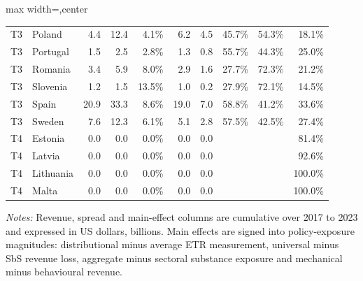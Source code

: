 \begin{table}[H]
\begin{adjustbox}{max width=\textwidth,center}
\begin{tabular}{@{}llrrrrrrrr@{}}
T3 & Poland &  4.4 &  12.4 &   4.1\% &  6.2 &  4.5 &  45.7\% &  54.3\% &  18.1\% \\
T3 & Portugal &  1.5 &   2.5 &   2.8\% &  1.3 &  0.8 &  55.7\% &  44.3\% &  25.0\% \\
T3 & Romania &  3.4 &   5.9 &   8.0\% &  2.9 &  1.6 &  27.7\% &  72.3\% &  21.2\% \\
T3 & Slovenia &  1.2 &   1.5 &  13.5\% &  1.0 &  0.2 &  27.9\% &  72.1\% &  14.5\% \\
T3 & Spain & 20.9 &  33.3 &   8.6\% & 19.0 &  7.0 &  58.8\% &  41.2\% &  33.6\% \\
T3 & Sweden &  7.6 &  12.3 &   6.1\% &  5.1 &  2.8 &  57.5\% &  42.5\% &  27.4\% \\
T4 & Estonia &  0.0 &   0.0 &   0.0\% &  0.0 &  0.0 &  &  &  81.4\% \\
T4 & Latvia &  0.0 &   0.0 &   0.0\% &  0.0 &  0.0 &  &  &  92.6\% \\
T4 & Lithuania &  0.0 &   0.0 &   0.0\% &  0.0 &  0.0 &  &  & 100.0\% \\
T4 & Malta &  0.0 &   0.0 &   0.0\% &  0.0 &  0.0 &  &  & 100.0\% \\
\bottomrule
\end{tabular}
\end{adjustbox}

\vspace{0.35em}
\noindent\begin{minipage}{\textwidth}
\footnotesize\raggedright\textit{Notes:} Revenue, spread and main-effect columns are cumulative over 2017 to 2023 and expressed in US dollars, billions. Main effects are signed into policy-exposure magnitudes: distributional minus average ETR measurement, universal minus SbS revenue loss, aggregate minus sectoral substance exposure and mechanical minus behavioural revenue.
\end{minipage}
\end{table}
